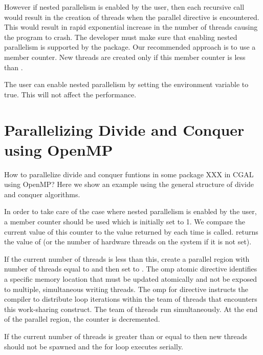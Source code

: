 However if nested parallelism is enabled by the user, then each
recursive call would result in the creation of threads when the
parallel directive is encountered.
This would result in rapid exponential increase in the number of
threads causing the program to crash.
The developer must make sure that enabling nested parallelism is
supported by the package.
Our recommended approach is to use a member counter. New threads are
created only if this member counter is less
than .

The user can enable nested parallelism by setting the environment
variable  to true. This will not affect the
performance.

\section{Parallelizing Divide and Conquer using OpenMP\label{sec:divide_and_conquer_openmp}}

How to parallelize divide and conquer funtions in some package XXX in CGAL using 
OpenMP? Here we show an example using the general structure of divide and 
conquer algorithms. 

In order to take care of the case where nested parallelism is enabled by the 
user, a member counter should be used  which is 
initially set to 1. We compare the current value of this counter to the value 
returned by  each time  is 
called.  returns the value of  
(or the number of hardware threads on the system if it is not set). 

If the current number of threads is less than this, create a parallel region 
with number of threads equal to  and then set 
 to . The omp atomic directive 
identifies a specific memory location that must be updated atomically and not be 
exposed to multiple, simultaneous writing threads. The omp for directive 
instructs the compiler to distribute loop iterations within the team of threads 
that encounters this work-sharing construct. The team of threads run 
simultaneously. At the end of the parallel region, the counter is decremented. 

If the current number of threads is greater than or equal to  
then new threads should not be spawned and the for loop executes serially.
 
